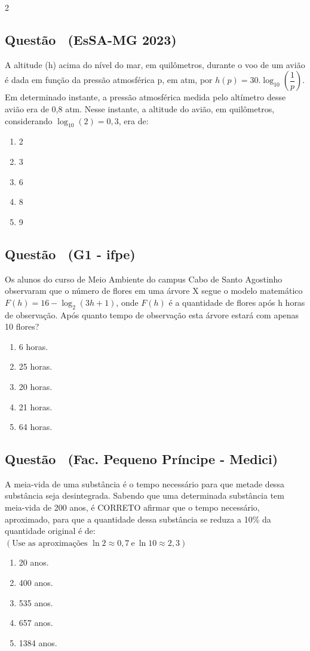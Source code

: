\documentclass[12pt]{article}
\newcommand{\vermelho}[1]{{\color{red}#1}}
\newcounter{questao}
\newcommand{\novaquestao}[1]{%
  \stepcounter{questao}%
  \subsection*{Questão \thequestao\ (#1)}%
}
\begin{document}
\begin{multicols}{2}
         \novaquestao{EsSA-MG 2023} A altitude (h) acima do nível do mar, em quilômetros, durante o voo de um avião é dada em função da pressão atmosférica p, em atm, por $h(p)=30.\log_{10}\left( \dfrac{1}{p} \right) $. Em determinado instante, a pressão atmosférica medida pelo altímetro desse avião era de 0,8 atm. Nesse instante, a altitude do avião, em quilômetros, considerando $\log_{10}(2)=0,3$, era de:
         
         	\begin{enumerate}[label=(\Alph*), noitemsep]
         		\item 2
         		\item \vermelho{3} %
         		\item 6
         		\item 8
         		\item 9
         	\end{enumerate}
         
         \novaquestao{G1 - ifpe} Os alunos do curso de Meio Ambiente do campus Cabo de Santo Agostinho observaram que o número de flores em uma árvore X segue o
         modelo matemático $F(h)=16-\log_{2}(3h+1)$, onde $F(h)$ é a quantidade de flores após h horas de observação. Após quanto tempo de observação esta árvore estará
         com apenas 10 flores?
         
         	\begin{enumerate}[label=(\Alph*), noitemsep]
         		\item 6 horas.
         		\item 25 horas.
         		\item 20 horas.
         		\item \vermelho{21 horas.} %
         		\item 64 horas.
         	\end{enumerate}
        	
         	
         \novaquestao{Fac. Pequeno Príncipe - Medici} A meia-vida de uma substância é o tempo necessário para que metade dessa substância seja desintegrada. Sabendo que
         uma determinada substância tem meia-vida de 200 anos, é CORRETO afirmar que o tempo necessário, aproximado, para que a quantidade dessa substância
         se reduza a 10\% da quantidade original é de: \\ 
         $\left( \text{Use as aproximações } \ln2 \approx 0,7\  \text{e} \  \ln10 \approx 2,3 \right)$ 
         
         	\begin{enumerate}[label=(\Alph*), noitemsep]
         		\item 20 anos.
         		\item 400 anos.
         		\item 535 anos.
         		\item \vermelho{657 anos.} %
         		\item 1384 anos.
         	\end{enumerate}
      

\end{multicols}
\end{document}
